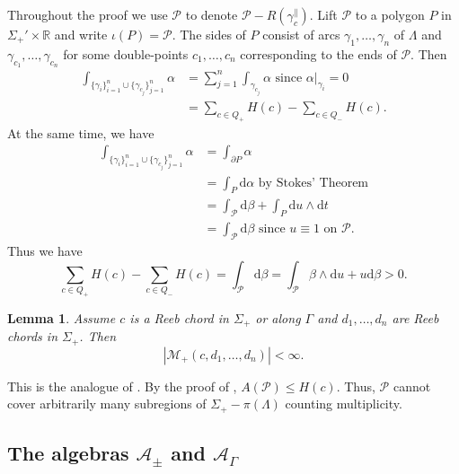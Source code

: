 \documentclass[11pt]{amsart}
\makeatletter
\renewenvironment{proof}[1][\proofname] {\par\pushQED{\qed}{\normalfont\bfseries\topsep6\p@\@plus6\p@\relax #1\@addpunct{.} }}{\popQED\endtrivlist\@endpefalse}
\theoremstyle{mystyle}
\newtheorem{lemma}[lemma]{Lemma}
\newcommand{\R}{\mathbb{R}}
\newcommand{\de}{\text{d}}
\newcommand{\<}{\langle}
\renewcommand{\>}{\rangle}
\makeatother
\begin{document}
\begin{proof}
    Throughout the proof we use $\mathcal{P}$ to denote $\mathcal{P} - R(\gamma_c^\parallel)$. Lift $\mathcal{P}$ to a polygon $P$ in $\Sigma_+' \times \R$ and write $\iota(P) = \mathcal{P}$. The sides of $P$ consist of arcs $\gamma_1, \dots , \gamma_n$ of $\Lambda$ and $\gamma_{c_1}, \dots , \gamma_{c_n}$ for some double-points $c_1, \dots, c_n$ corresponding to the ends of $\mathcal{P}$. Then \begin{align*}
		\int_{\{\gamma_i\}_{i = 1}^n \cup \{\gamma_{c_j}\}_{j = 1}^n} \alpha &= \sum_{j = 1}^n \int_{\gamma_{c_j}} \alpha \text{ since } \alpha|_{\gamma_i} = 0 \\
		&= \sum_{c \in Q_+} H(c) - \sum_{c \in Q_-} H(c).
	\end{align*} At the same time, we have \begin{align*}
		\int_{\{\gamma_i\}_{i = 1}^n \cup \{\gamma_{c_j}\}_{j = 1}^n} \alpha &= \int_{\partial P} \alpha \\
		&= \int_P \de \alpha \text{ by Stokes' Theorem}\\
		&= \int_{\mathcal{P}} \de \beta + \int_{P} \de u \wedge \de t \\
		&= \int_{\mathcal{P}} \de \beta \text{ since } u \equiv 1 \text{ on } \mathcal{P}.
	\end{align*} Thus we have \[\sum_{c \in Q_+} H(c) - \sum_{c \in Q_-} H(c) = \int_{\mathcal{P}} \de \beta = \int_{\mathcal{P}} \beta \wedge \de u + u\de \beta > 0.\]
\end{proof}

\begin{lemma}\label{finitePolygon}
    Assume $c$ is a Reeb chord in $\Sigma_+$ or along $\Gamma$ and $d_1, \dots , d_n$ are Reeb chords in $\Sigma_+$. Then \[|\mathcal{M_+}(c, d_1, \dots , d_n)| < \infty.\] 
\end{lemma}

\begin{proof}
     This is the analogue of \cite[Lem. 3.9]{sabloff2003circle}. By the proof of , $A(\mathcal{P}) \leq H(c)$. Thus, $\mathcal{P}$ cannot cover arbitrarily many subregions of $\Sigma_+-\pi(\Lambda)$ counting multiplicity.
\end{proof}

\subsection{The algebras $\mathcal{A}_\pm$ and $\mathcal{A}_\Gamma$} \text{ }
\end{document}
